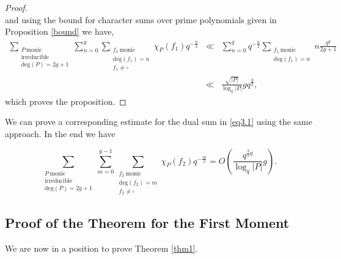 \documentclass[11pt]{amsart}
\begin{document}
\begin{proof}
\begin{equation}
\end{equation}
and using the bound for character sums over prime polynomials given in Proposition \ref{bound} we have,
\begin{eqnarray}
\sum_{\substack{P \ \mathrm{monic} \\ \mathrm{irreducible} \\ \mathrm{deg}(P)=2g+1}}\sum_{n=0}^{g}\sum_{\substack{f_{1} \ \mathrm{monic} \\ \mathrm{deg}(f_{1})=n \\ f_{1}\neq\square}}\chi_{P}(f_{1})q^{-\tfrac{n}{2}}&\ll&\sum_{n=0}^{g}q^{-\tfrac{n}{2}}\sum_{\substack{f_{1} \ \mathrm{monic} \\ \mathrm{deg}(f_{1})=n}}n\frac{q^{g}}{2g+1}\nonumber\\
&\ll& \frac{\sqrt{|P|}}{\log_{q}|P|}gq^{\tfrac{g}{2}},\nonumber
\end{eqnarray}
which proves the proposition.
\end{proof}

We can prove a corresponding estimate for the dual sum in \eqref{eq3.1} using the same approach. In the end we have

\begin{prop}
\label{prop3.4}
\begin{equation}
\sum_{\substack{P \ \mathrm{monic} \\ \mathrm{irreducible} \\ \mathrm{deg}(P)=2g+1}}\sum_{m=0}^{g-1}\sum_{\substack{f_{2} \ \mathrm{monic} \\ \mathrm{deg}(f_{2})=m \\ f_{2}\neq\square}}\chi_{P}(f_{2})q^{-\tfrac{m}{2}}=O\left(\frac{q^{\tfrac{3}{2}g}}{\log_{q}|P|}g\right).\nonumber
\end{equation}
\end{prop}

\subsection{Proof of the Theorem for the First Moment}

We are now in a position to prove Theorem \ref{thm1}.
\end{document}
